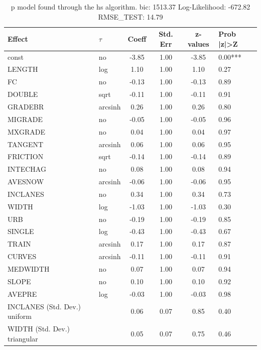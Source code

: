 \begin{table}
	\caption{p model found through the hs algorithm. bic: 1513.37 Log-Likelihood: -672.82 RMSE_TEST: 14.79}
	\begin{center}
		\begin{tabular}{|l|l|c|c|c|l|}
			\hline
			Effect & $\tau$ & Coeff & Std. Err & z-values & Prob |z|>Z \\
			\hline
			const & no & -3.85 & 1.00 & -3.85 & 0.00*** \\
			\hline
			LENGTH & log & 1.10 & 1.00 & 1.10 & 0.27 \\
			\hline
			FC & no & -0.13 & 1.00 & -0.13 & 0.89 \\
			\hline
			DOUBLE & sqrt & -0.11 & 1.00 & -0.11 & 0.91 \\
			\hline
			GRADEBR & arcsinh & 0.26 & 1.00 & 0.26 & 0.80 \\
			\hline
			MIGRADE & no & -0.05 & 1.00 & -0.05 & 0.96 \\
			\hline
			MXGRADE & no & 0.04 & 1.00 & 0.04 & 0.97 \\
			\hline
			TANGENT & arcsinh & 0.06 & 1.00 & 0.06 & 0.95 \\
			\hline
			FRICTION & sqrt & -0.14 & 1.00 & -0.14 & 0.89 \\
			\hline
			INTECHAG & no & 0.08 & 1.00 & 0.08 & 0.94 \\
			\hline
			AVESNOW & arcsinh & -0.06 & 1.00 & -0.06 & 0.95 \\
			\hline
			INCLANES & no & 0.34 & 1.00 & 0.34 & 0.73 \\
			\hline
			WIDTH & log & -1.03 & 1.00 & -1.03 & 0.30 \\
			\hline
			URB & no & -0.19 & 1.00 & -0.19 & 0.85 \\
			\hline
			SINGLE & log & -0.43 & 1.00 & -0.43 & 0.67 \\
			\hline
			TRAIN & arcsinh & 0.17 & 1.00 & 0.17 & 0.87 \\
			\hline
			CURVES & arcsinh & -0.11 & 1.00 & -0.11 & 0.91 \\
			\hline
			MEDWIDTH & no & 0.07 & 1.00 & 0.07 & 0.94 \\
			\hline
			SLOPE & no & 0.10 & 1.00 & 0.10 & 0.92 \\
			\hline
			AVEPRE & log & -0.03 & 1.00 & -0.03 & 0.98 \\
			\hline
			INCLANES (Std. Dev.) uniform &  & 0.06 & 0.07 & 0.85 & 0.40 \\
			\hline
			WIDTH (Std. Dev.) triangular &  & 0.05 & 0.07 & 0.75 & 0.46 \\

\end{tabular}
\end{center}
\end{table}
